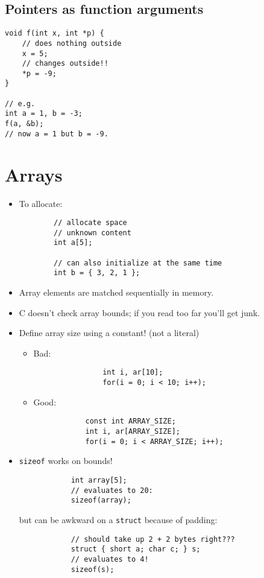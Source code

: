 \subsection{Pointers as function arguments}
\begin{verbatim}
void f(int x, int *p) {
	// does nothing outside
	x = 5;
	// changes outside!!
	*p = -9;
}

// e.g.
int a = 1, b = -3;
f(a, &b);
// now a = 1 but b = -9.
\end{verbatim}

\section{Arrays}
\begin{itemize}
	\item To allocate:
		\begin{verbatim}
		// allocate space
		// unknown content
		int a[5];
		
		// can also initialize at the same time
		int b = { 3, 2, 1 };
		\end{verbatim}
	\item Array elements are matched sequentially in memory.
	\item C doesn't check array bounds; if you read too far you'll get junk.
	\item Define array size using a constant! (not a literal)
	\begin{itemize}
		\item Bad:
			\begin{verbatim}
				int i, ar[10];
				for(i = 0; i < 10; i++);
			\end{verbatim}
		\item Good:
			\begin{verbatim}
			const int ARRAY_SIZE;
			int i, ar[ARRAY_SIZE];
			for(i = 0; i < ARRAY_SIZE; i++);
			\end{verbatim}
	\end{itemize}
	\item \texttt{sizeof} works on bounds!
		\begin{verbatim}
			int array[5];
			// evaluates to 20:
			sizeof(array);
		\end{verbatim}
		
		but can be awkward on a \texttt{struct} because of padding:
		\begin{verbatim}
			// should take up 2 + 2 bytes right???
			struct { short a; char c; } s;
			// evaluates to 4!
			sizeof(s);
		\end{verbatim}
\end{itemize}